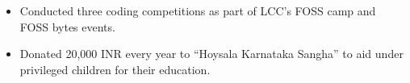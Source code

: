 \documentclass[a4paper, 10pt]{extarticle}
\begin{document}
\begin{large}
\begin{itemize}
    \item{Conducted three coding competitions as part of LCC's FOSS camp and
FOSS bytes events.}
    \vspace{-0.1cm}
    
    \item{Donated 20,000 INR every year to ``Hoysala Karnataka Sangha'' to aid
under privileged children for their education.}
    \vspace{-0.1cm}
    
\end{itemize}

\end{large}
\end{document}
